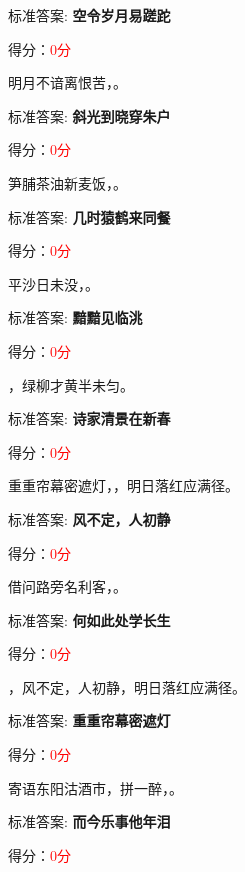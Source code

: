 \documentclass[12pt, a4paper, addpoints, answers]{exam}
\begin{document}
\begin{questions}
标准答案: \textbf{空令岁月易蹉跎}   

得分：\textcolor{red}{0分} 

\question[3] 明月不谙离恨苦，\fillin 。

标准答案: \textbf{斜光到晓穿朱户}   

得分：\textcolor{red}{0分} 

\question[3] 笋脯茶油新麦饭，\fillin 。

标准答案: \textbf{几时猿鹤来同餐}   

得分：\textcolor{red}{0分} 

\question[3] 平沙日未没，\fillin 。

标准答案: \textbf{黯黯见临洮}   

得分：\textcolor{red}{0分} 

\question[3] \fillin ，绿柳才黄半未匀。

标准答案: \textbf{诗家清景在新春}   

得分：\textcolor{red}{0分} 

\question[3] 重重帘幕密遮灯，\fillin ，明日落红应满径。

标准答案: \textbf{风不定，人初静}   

得分：\textcolor{red}{0分} 

\question[3] 借问路旁名利客，\fillin 。

标准答案: \textbf{何如此处学长生}   

得分：\textcolor{red}{0分} 

\question[3] \fillin ，风不定，人初静，明日落红应满径。

标准答案: \textbf{重重帘幕密遮灯}   

得分：\textcolor{red}{0分} 

\question[3] 寄语东阳沽酒市，拼一醉，\fillin 。

标准答案: \textbf{而今乐事他年泪}   

得分：\textcolor{red}{0分} 
\end{questions}

\hspace{5cm}
\end{document}
